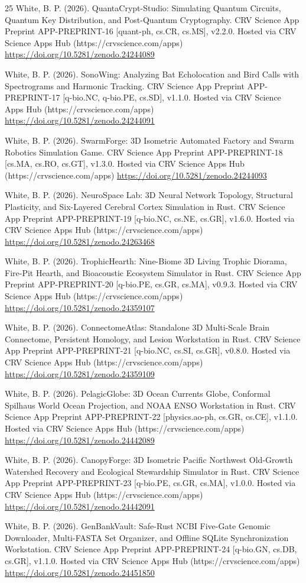 \documentclass[10pt,letterpaper]{article}
\begin{document}
\begin{thebibliography}{25}
 White, B. P. (2026). QuantaCrypt-Studio: Simulating Quantum Circuits, Quantum Key Distribution, and Post-Quantum Cryptography. CRV Science App Preprint APP-PREPRINT-16 [quant-ph, cs.CR, cs.MS], v2.2.0. Hosted via CRV Science Apps Hub (https://crvscience.com/apps) \url{https://doi.org/10.5281/zenodo.24244089}

 White, B. P. (2026). SonoWing: Analyzing Bat Echolocation and Bird Calls with Spectrograms and Harmonic Tracking. CRV Science App Preprint APP-PREPRINT-17 [q-bio.NC, q-bio.PE, cs.SD], v1.1.0. Hosted via CRV Science Apps Hub (https://crvscience.com/apps) \url{https://doi.org/10.5281/zenodo.24244091}

 White, B. P. (2026). SwarmForge: 3D Isometric Automated Factory and Swarm Robotics Simulation Game. CRV Science App Preprint APP-PREPRINT-18 [cs.MA, cs.RO, cs.GT], v1.3.0. Hosted via CRV Science Apps Hub (https://crvscience.com/apps) \url{https://doi.org/10.5281/zenodo.24244093}

 White, B. P. (2026). NeuroSpace Lab: 3D Neural Network Topology, Structural Plasticity, and Six-Layered Cerebral Cortex Simulation in Rust. CRV Science App Preprint APP-PREPRINT-19 [q-bio.NC, cs.NE, cs.GR], v1.6.0. Hosted via CRV Science Apps Hub (https://crvscience.com/apps) \url{https://doi.org/10.5281/zenodo.24263468}

 White, B. P. (2026). TrophicHearth: Nine-Biome 3D Living Trophic Diorama, Fire-Pit Hearth, and Bioacoustic Ecosystem Simulator in Rust. CRV Science App Preprint APP-PREPRINT-20 [q-bio.PE, cs.GR, cs.MA], v0.9.3. Hosted via CRV Science Apps Hub (https://crvscience.com/apps) \url{https://doi.org/10.5281/zenodo.24359107}

 White, B. P. (2026). ConnectomeAtlas: Standalone 3D Multi-Scale Brain Connectome, Persistent Homology, and Lesion Workstation in Rust. CRV Science App Preprint APP-PREPRINT-21 [q-bio.NC, cs.SI, cs.GR], v0.8.0. Hosted via CRV Science Apps Hub (https://crvscience.com/apps) \url{https://doi.org/10.5281/zenodo.24359109}

 White, B. P. (2026). PelagicGlobe: 3D Ocean Currents Globe, Conformal Spilhaus World Ocean Projection, and NOAA ENSO Workstation in Rust. CRV Science App Preprint APP-PREPRINT-22 [physics.ao-ph, cs.GR, cs.CE], v1.1.0. Hosted via CRV Science Apps Hub (https://crvscience.com/apps) \url{https://doi.org/10.5281/zenodo.24442089}

 White, B. P. (2026). CanopyForge: 3D Isometric Pacific Northwest Old-Growth Watershed Recovery and Ecological Stewardship Simulator in Rust. CRV Science App Preprint APP-PREPRINT-23 [q-bio.PE, cs.GR, cs.MA], v1.0.0. Hosted via CRV Science Apps Hub (https://crvscience.com/apps) \url{https://doi.org/10.5281/zenodo.24442091}

 White, B. P. (2026). GenBankVault: Safe-Rust NCBI Five-Gate Genomic Downloader, Multi-FASTA Set Organizer, and Offline SQLite Synchronization Workstation. CRV Science App Preprint APP-PREPRINT-24 [q-bio.GN, cs.DB, cs.GR], v1.1.0. Hosted via CRV Science Apps Hub (https://crvscience.com/apps) \url{https://doi.org/10.5281/zenodo.24451850}
\end{thebibliography}
\end{document}
